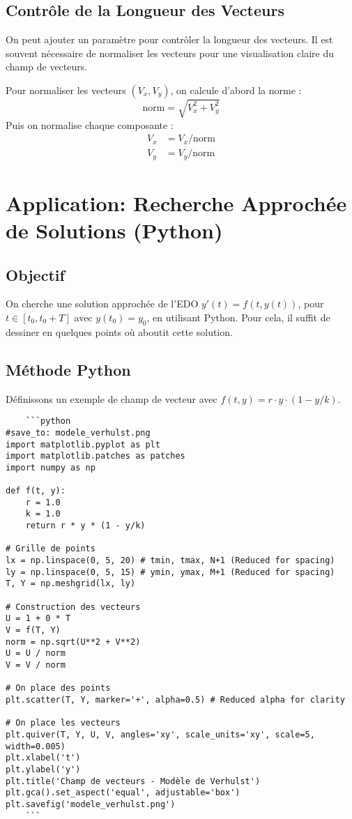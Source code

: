 \documentclass{article}
\begin{document}
\subsection{Contrôle de la Longueur des Vecteurs}

On peut ajouter un paramètre pour contrôler la longueur des vecteurs.  Il est souvent nécessaire de normaliser les vecteurs pour une visualisation claire du champ de vecteurs.

Pour normaliser les vecteurs $(V_x, V_y)$, on calcule d'abord la norme :
\begin{equation}
\text{norm} = \sqrt{V_x^2 + V_y^2}
\end{equation}
Puis on normalise chaque composante :
\begin{align*}
V_x &= V_x / \text{norm} \\
V_y &= V_y / \text{norm}
\end{align*}

\section{Application: Recherche Approchée de Solutions (Python)}

\subsection{Objectif}

On cherche une solution approchée de l'EDO $y'(t) = f(t, y(t))$, pour $t \in [t_0, t_0 + T]$ avec $y(t_0) = y_0$, en utilisant Python. Pour cela, il suffit de dessiner en quelques points où aboutit cette solution.

\subsection{Méthode Python}

Définissons un exemple de champ de vecteur avec $f(t, y) = r \cdot y \cdot (1 - y/k)$.

\begin{verbatim}
    ```python
#save_to: modele_verhulst.png
import matplotlib.pyplot as plt
import matplotlib.patches as patches
import numpy as np

def f(t, y):
    r = 1.0
    k = 1.0
    return r * y * (1 - y/k)

# Grille de points
lx = np.linspace(0, 5, 20) # tmin, tmax, N+1 (Reduced for spacing)
ly = np.linspace(0, 5, 15) # ymin, ymax, M+1 (Reduced for spacing)
T, Y = np.meshgrid(lx, ly)

# Construction des vecteurs
U = 1 + 0 * T
V = f(T, Y)
norm = np.sqrt(U**2 + V**2)
U = U / norm
V = V / norm

# On place des points
plt.scatter(T, Y, marker='+', alpha=0.5) # Reduced alpha for clarity

# On place les vecteurs
plt.quiver(T, Y, U, V, angles='xy', scale_units='xy', scale=5, width=0.005)
plt.xlabel('t')
plt.ylabel('y')
plt.title('Champ de vecteurs - Modèle de Verhulst')
plt.gca().set_aspect('equal', adjustable='box')
plt.savefig('modele_verhulst.png')
    ```
\end{verbatim}
\end{document}
